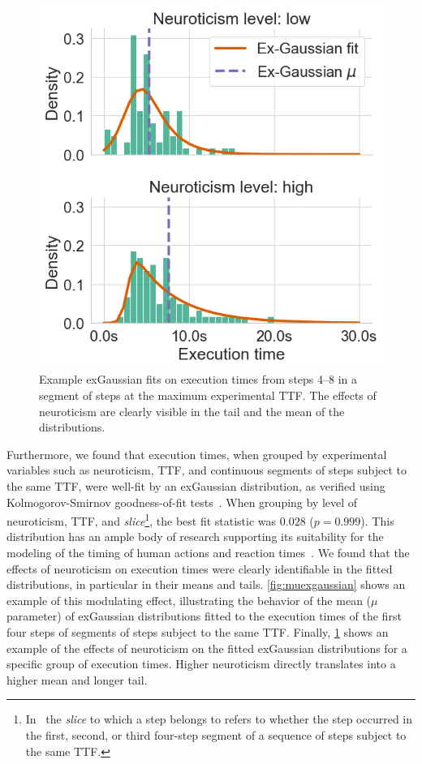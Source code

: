 \begin{figure}
    \centering
    \includegraphics[width=\columnwidth]{figs/new_model/dist_fits_neuro.png}
    \caption{%
        Example \ac{exGaussian} fits on execution times from steps \numrange{4}{8} in a segment of steps at the maximum experimental \ac{TTF}.
        The effects of neuroticism are clearly visible in the tail and the mean of the distributions.
    }\label{fig:fitsneuro}
\end{figure}

Furthermore, we found that execution times, when grouped by experimental variables such as neuroticism, \ac{TTF}, and continuous segments of steps subject to the same \ac{TTF}, were well-fit by an \ac{exGaussian} distribution, as verified using Kolmogorov-Smirnov goodness-of-fit tests~\cite{massey_jr1951kolmogorov}.
When grouping by level of neuroticism, \ac{TTF}, and \emph{slice}\footnote{%
In~\cite{olguinmunoz2021impact} the \emph{slice} to which a step belongs to refers to whether the step occurred in the first, second, or third four-step segment of a sequence of steps subject to the same \ac{TTF}.
}, the best fit statistic was \ensuremath{0.028} (\ensuremath{p = 0.999}).
This distribution has an ample body of research supporting its suitability for the modeling of the timing of human actions and reaction times~\cite{rohrer1994analysis,palmer2011what,marmolejo_ramos2022generalised}.
We found that the effects of neuroticism on execution times were clearly identifiable in the fitted distributions, in particular in their means and tails.
\cref{fig:muexgaussian} shows an example of this modulating effect, illustrating the behavior of the mean (\( \mu \) parameter) of \ac{exGaussian} distributions fitted to the execution times of the first four steps of segments of steps subject to the same \ac{TTF}.
Finally, \cref{fig:fitsneuro} shows an example of the effects of neuroticism on the fitted \ac{exGaussian} distributions for a specific group of execution times.
Higher neuroticism directly translates into a higher mean and longer tail.